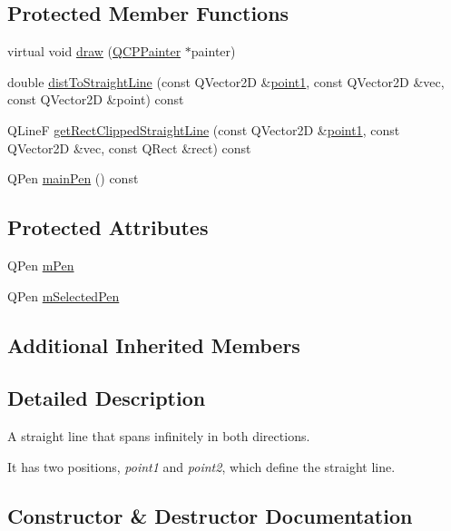\subsection*{Protected Member Functions}
\begin{DoxyCompactItemize}
\item 
virtual void \hyperlink{classQCPItemStraightLine_a2daa1e1253216c26565d56a2d5530170}{draw} (\hyperlink{classQCPPainter}{Q\+C\+P\+Painter} $\ast$painter)
\item 
double \hyperlink{classQCPItemStraightLine_adc9b6c5bd33c7f806b748b79dfa25926}{dist\+To\+Straight\+Line} (const Q\+Vector2D \&\hyperlink{classQCPItemStraightLine_ac131a6ffe456f2cc7364dce541fe0120}{point1}, const Q\+Vector2D \&vec, const Q\+Vector2D \&point) const 
\item 
Q\+LineF \hyperlink{classQCPItemStraightLine_af18ac29577b5b96fece15b0ffea70177}{get\+Rect\+Clipped\+Straight\+Line} (const Q\+Vector2D \&\hyperlink{classQCPItemStraightLine_ac131a6ffe456f2cc7364dce541fe0120}{point1}, const Q\+Vector2D \&vec, const Q\+Rect \&rect) const 
\item 
Q\+Pen \hyperlink{classQCPItemStraightLine_a63ef39814c5b560dbb7b13e3fec1d940}{main\+Pen} () const 
\end{DoxyCompactItemize}
\subsection*{Protected Attributes}
\begin{DoxyCompactItemize}
\item 
Q\+Pen \hyperlink{classQCPItemStraightLine_a15106ddc2ebd73ed5c1bc57aa92bee8f}{m\+Pen}
\item 
Q\+Pen \hyperlink{classQCPItemStraightLine_a0307a0d56a018656adbf798bc84c2a4b}{m\+Selected\+Pen}
\end{DoxyCompactItemize}
\subsection*{Additional Inherited Members}


\subsection{Detailed Description}
A straight line that spans infinitely in both directions. 

 It has two positions, {\itshape point1} and {\itshape point2}, which define the straight line. 

\subsection{Constructor \& Destructor Documentation}
